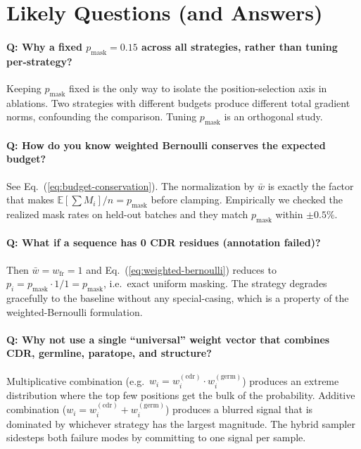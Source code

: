 \documentclass[11pt]{article}
\newcommand{\pmask}{p_{\text{mask}}}
\newcommand{\E}{\mathbb{E}}
\begin{document}
\section{Likely Questions (and Answers)}

\paragraph{Q: Why a fixed $\pmask = 0.15$ across all strategies, rather
than tuning per-strategy?}
Keeping $\pmask$ fixed is the only way to isolate the
position-selection axis in ablations. Two strategies with different
budgets produce different total gradient norms, confounding the
comparison. Tuning $\pmask$ is an orthogonal study.

\paragraph{Q: How do you know weighted Bernoulli conserves the expected
budget?}
See Eq.~(\ref{eq:budget-conservation}). The normalization by $\bar w$
is exactly the factor that makes $\E[\sum M_i]/n = \pmask$ before
clamping. Empirically we checked the realized mask rates on held-out
batches and they match $\pmask$ within $\pm 0.5\%$.

\paragraph{Q: What if a sequence has 0 CDR residues (annotation failed)?}
Then $\bar w = w_{\text{fr}} = 1$ and Eq.~(\ref{eq:weighted-bernoulli})
reduces to $p_i = \pmask \cdot 1/1 = \pmask$, i.e.\ exact uniform
masking. The strategy degrades gracefully to the baseline without
any special-casing, which is a property of the weighted-Bernoulli
formulation.

\paragraph{Q: Why not use a single ``universal'' weight vector that
combines CDR, germline, paratope, and structure?}
Multiplicative combination (e.g.\ $w_i = w^{(\text{cdr})}_i \cdot w^{(\text{germ})}_i$)
produces an extreme distribution where the top few positions get the
bulk of the probability. Additive combination
($w_i = w^{(\text{cdr})}_i + w^{(\text{germ})}_i$) produces a blurred
signal that is dominated by whichever strategy has the largest
magnitude. The hybrid sampler sidesteps both failure modes by
committing to one signal per sample.
\end{document}
